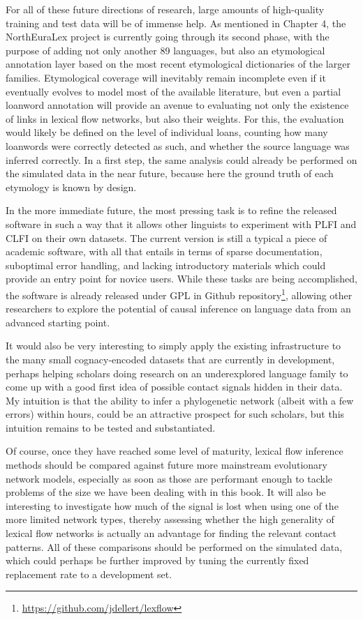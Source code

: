 For all of these future directions of research, large amounts of high-quality training and test data will be of immense help. As mentioned in Chapter 4, the NorthEuraLex project is currently going through its second phase, with the purpose of adding not only another 89 languages, but also an etymological annotation layer based on the most recent etymological dictionaries of the larger families. Etymological coverage will inevitably remain incomplete even if it eventually evolves to model most of the available literature, but even a partial loanword annotation will provide an avenue to evaluating not only the existence of links in lexical flow networks, but also their weights. For this, the evaluation would likely be defined on the level of individual loans, counting how many loanwords were correctly detected as such, and whether the source language was inferred correctly. In a first step, the same analysis could already be performed on the simulated data in the near future, because here the ground truth of each etymology is known by design.

In the more immediate future, the most pressing task is to refine the released software in such a way that it allows other linguists to experiment with PLFI and CLFI on their own datasets. The current version is still a typical a piece of academic software, with all that entails in terms of sparse documentation, suboptimal error handling, and lacking introductory materials which could provide an entry point for novice users. While these tasks are being accomplished, the software is already released under GPL in Github repository\footnote{\url{https://github.com/jdellert/lexflow}}, allowing other researchers to explore the potential of causal inference on language data from an advanced starting point.

It would also be very interesting to simply apply the existing infrastructure to the many small cognacy-encoded datasets that are currently in development, perhaps helping scholars doing research on an underexplored language family to come up with a good first idea of possible contact signals hidden in their data. My intuition is that the ability to infer a phylogenetic network (albeit with a few errors) within hours, could be an attractive prospect for such scholars, but this intuition remains to be tested and substantiated.

Of course, once they have reached some level of maturity, lexical flow inference methods should be compared against future more mainstream evolutionary network models, especially as soon as those are performant enough to tackle problems of the size we have been dealing with in this book. It will also be interesting to investigate how much of the signal is lost when using one of the more limited network types, thereby assessing whether the high generality of lexical flow networks is actually an advantage for finding the relevant contact patterns. All of these comparisons should be performed on the simulated data, which could perhaps be further improved by tuning the currently fixed replacement rate to a development set.

